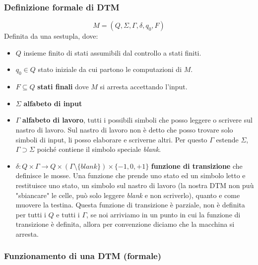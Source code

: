 \documentclass{article}
\begin{document}
\subsubsection{Definizione formale di DTM}
$$M=(Q,\Sigma,\Gamma,\delta,q_0,F)$$
Definita da una sestupla, dove:
\begin{itemize}
    \item $Q$ insieme finito di stati assumibili dal controllo a stati finiti.
    \item $q_0\in Q$ stato iniziale da cui partono le computazioni di $M$.
    \item $F\subseteq Q$ \textbf{stati finali} dove $M$ si arresta accettando l'input.
    \item $\Sigma$ \textbf{alfabeto di input}
    \item $\Gamma$ \textbf{alfabeto di lavoro}, tutti i possibili simboli che posso leggere
    o scrivere sul nastro di lavoro. Sul nastro di lavoro non è detto che posso trovare
    solo simboli di input, li posso elaborare e scriverne altri. Per questo $\Gamma$ estende
    $\Sigma$, $\Gamma\supset\Sigma$ poiché contiene il simbolo speciale \textit{blank}.
    \item $\delta:Q\times\Gamma\rightarrow Q\times(\Gamma\setminus\{blank\})\times\{-1,0,+1\}$
    \textbf{funzione di transizione} che definisce le mosse. Una funzione che prende uno stato ed
    un simbolo letto e restituisce uno stato, un simbolo sul nastro di lavoro (la nostra DTM non
    puù "sbiancare" le celle, può solo leggere \textit{blank} e non scriverlo), quanto e come muovere la testina. Questa funzione di transizione
    è parziale, non è definita per tutti i $Q$ e tutti i $\Gamma$, se noi arriviamo in un punto
    in cui la funzione di transizione è definita, allora per convenzione diciamo che la macchina
    si arresta.
\end{itemize}

\subsubsection{Funzionamento di una DTM (formale)}
\end{document}

